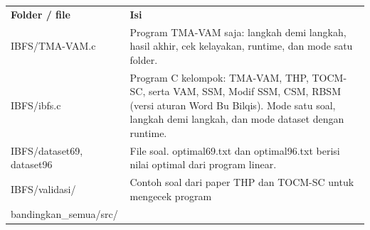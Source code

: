 \documentclass[10pt,a4paper]{article}
\newcounter{none}
\begin{document}
{\def\LTcaptype{none} %
\begin{longtable}[]{@{}
  >{\raggedright\arraybackslash}p{}
  >{\raggedright\arraybackslash}p{}@{}}
\toprule\noalign{}
\begin{minipage}[b]{\linewidth}\raggedright
\textbf{Folder / file}
\end{minipage} & \begin{minipage}[b]{\linewidth}\centering
\textbf{Isi}
\end{minipage} \\
\begin{minipage}[b]{\linewidth}\raggedright
IBFS/TMA-VAM.c
\end{minipage} & \begin{minipage}[b]{\linewidth}\centering
Program TMA-VAM saja: langkah demi langkah, hasil akhir, cek kelayakan,
runtime, dan mode satu folder.
\end{minipage} \\
\begin{minipage}[b]{\linewidth}\raggedright
IBFS/ibfs.c
\end{minipage} & \begin{minipage}[b]{\linewidth}\centering
Program C kelompok: TMA-VAM, THP, TOCM-SC, serta VAM, SSM, Modif SSM,
CSM, RBSM (versi aturan Word Bu Bilqis). Mode satu soal, langkah demi
langkah, dan mode dataset dengan runtime.
\end{minipage} \\
\begin{minipage}[b]{\linewidth}\raggedright
IBFS/dataset69, dataset96
\end{minipage} & \begin{minipage}[b]{\linewidth}\centering
File soal. optimal69.txt dan optimal96.txt berisi nilai optimal dari
program linear.
\end{minipage} \\
\begin{minipage}[b]{\linewidth}\raggedright
IBFS/validasi/
\end{minipage} & \begin{minipage}[b]{\linewidth}\centering
Contoh soal dari paper THP dan TOCM-SC untuk mengecek program
\end{minipage} \\
\begin{minipage}[b]{\linewidth}\raggedright
bandingkan\_semua/src/
\end{minipage} & \begin{minipage}[b]{\linewidth}\centering

\end{minipage}
\end{longtable}}
\end{document}
